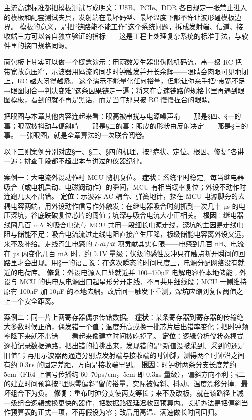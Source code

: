 主流高速标准都把模板测试写成明文：USB、PCIe、DDR 各自规定一张禁止进入的模板和配套测试夹具，发射端在最坏码型、最坏温度下都不许让波形碰模板边界。
模板的意义，是把“链路能不能工作”这个系统问题，拆成发射端、信道、接收端三方可以各自独立验证的指标——这是工程上处理复杂系统的标准手法，与软件里的接口规格同源。

面包板上其实可以做一个概念演示：用函数发生器出伪随机码流，串一级 RC 把带宽故意压窄，示波器用码流的同步时钟触发并开长余辉——眼睛会肉眼可见地闭上，RC 越大闭得越紧。
这个演示不能量化任何裕量，但能让你亲手把“带宽不足→眼图闭合→判决变难”这条因果链走一遍；将来在高速链路的规格书里再遇到眼图模板，看到的就不再是黑话，而是当年那只被 RC 慢慢捏合的眼睛。

把眼图与本章其他内容连起来看：眼高被串扰与电源噪声啃——那是§四、§一的事；眼宽被抖动与偏斜啃——那是§二的事；眼皮的形状由反射决定——那是§三的事。
一张眼图，就是全章算法的一次联合阅卷。

以下三则案例分别对应§一、§二、§四的机理，按“症状、定位、根因、修复”各讲一遍；排查手段都不超出本节讲过的仪器纪律。

案例一：大电流外设动作时 MCU 随机复位。
\textbf{症状}：系统平时稳定，每当继电器吸合（或电机启动、电磁阀动作）的瞬间，MCU 有相当概率复位；外设不动作时连跑几天不出错。
\textbf{定位}：示波器 AC 耦合、弹簧地针，探在 MCU 电源脚旁的去耦电容两端，用外设动作信号作外触发：在继电器吸合时刻抓到一次几十 µs 的电压深坑，谷底跌破复位芯片的阈值；坑深与吸合电流大小正相关。
\textbf{根因}：继电器线圈几百 mA 的吸合电流与 MCU 共用一段细长电源走线，深坑的主因是走线电阻与储能不足：吸合电流流过走线电阻直接产生压降，板级储能电容离外设又远，来不及补给。走线寄生电感的 $L\,di/dt$ 项贡献其实有限——电感到几百 nH、电流在 µs 内变化几百 mA 时，约 0.1V 量级；伏级的感性反冲只在触点断开瞬间的回路里才会出现。用§一的语言说：在这次瞬态的时间尺度上，电源分配网络没有就近的电荷库。
\textbf{修复}：外设电源入口处就近并 100--470µF 电解电容作本地储能；外设与 MCU 的供电从电源出口起星形分开走线，不再共用细线段；MCU 一侧维持原有 100nF 加 10µF 的本地去耦。改后同一触发下重测，深坑应缩到复位阈值之上一个安全距离。

案例二：同一片上两寄存器偶尔传错数据。
\textbf{症状}：某条寄存器到寄存器的传输绝大多数时候正确，偶发错一个值；温度升高或换一批芯片后出错率变化；把时钟频率降下来就不出错——看起来像建立时间被吃掉了。
\textbf{定位}：逻辑分析仪状态模式逐拍记录数据通路，把出错的拍挑出来，发现错的是“新值没被采到、采到的还是旧值”；再用示波器两通道分别点发射端与接收端的时钟脚，测得两个时钟沿之间有约 0.3ns 的固定差距，方向是接收端早到。
\textbf{根因}：时钟树两条分支长度差约 5cm（FR4 上信号传播约 60--70ps/cm，5cm 即 0.3ns 量级），偏斜方向不利；§二的建立时间预算按“理想零偏斜”留的裕量，实际被偏斜、抖动、温度漂移分掉，最坏组合下为负。
\textbf{修复}：重布时钟分支使两支等长；来不及改板，就在该路径上减一级组合逻辑或换更快的器件，把数据路径延迟收回预算内。长期办法是把偏斜当作预算表的正式一项，不再假设为零；改后用高温、满速做长时间回归。

